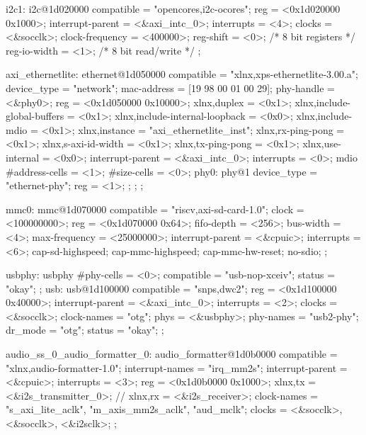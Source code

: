 \begin{CodeBlock}[language=BookDTS]
{{        i2c1: i2c@1d020000 {
            compatible = "opencores,i2c-ocores";
            reg = <0x1d020000 0x1000>;
            interrupt-parent = <&axi_intc_0>;
            interrupts = <4>;
            clocks = <&socclk>;
            clock-frequency = <400000>;
            reg-shift = <0>;    /* 8 bit registers */
            reg-io-width = <1>; /* 8 bit read/write */
        };

        axi_ethernetlite: ethernet@1d050000 {
            compatible = "xlnx,xps-ethernetlite-3.00.a";
            device_type = "network";
            mac-address = [19 98 00 01 00 29];
            phy-handle = <&phy0>;
            reg = <0x1d050000 0x10000>;
            xlnx,duplex = <0x1>;
            xlnx,include-global-buffers = <0x1>;
            xlnx,include-internal-loopback = <0x0>;
            xlnx,include-mdio = <0x1>;
            xlnx,instance = "axi_ethernetlite_inst";
            xlnx,rx-ping-pong = <0x1>;
            xlnx,s-axi-id-width = <0x1>;
            xlnx,tx-ping-pong = <0x1>;
            xlnx,use-internal = <0x0>;
            interrupt-parent = <&axi_intc_0>;
            interrupts = <0>;
            mdio {
                #address-cells = <1>;
                #size-cells = <0>;
                phy0: phy@1 {
                    device_type = "ethernet-phy";
                    reg = <1>;
                } ;
            } ;
        } ;

        mmc0: mmc@1d070000 {
            compatible = "riscv,axi-sd-card-1.0";
            clock = <100000000>;
            reg = <0x1d070000 0x64>;
            fifo-depth = <256>;
            bus-width = <4>;
            max-frequency = <25000000>;
            interrupt-parent = <&cpuic>;
            interrupts = <6>;
            cap-sd-highspeed;
            cap-mmc-highspeed;
            cap-mmc-hw-reset;
            no-sdio;
        };

        usbphy: usbphy {
            #phy-cells = <0>;
            compatible = "usb-nop-xceiv";
            status = "okay";
        };
        usb: usb@1d100000 {
            compatible = "snps,dwc2";
            reg = <0x1d100000 0x40000>;
            interrupt-parent = <&axi_intc_0>;
            interrupts = <2>;
            clocks = <&socclk>;
            clock-names = "otg";
            phys = <&usbphy>;
            phy-names = "usb2-phy";
            dr_mode = "otg";
            status = "okay";
        };

        audio_ss_0_audio_formatter_0: audio_formatter@1d0b0000 {
            compatible = "xlnx,audio-formatter-1.0";
            interrupt-names = "irq_mm2s";
            interrupt-parent = <&cpuic>;
            interrupts = <3>;
            reg = <0x1d0b0000 0x1000>;
            xlnx,tx = <&i2s_transmitter_0>;
            // xlnx,rx = <&i2s_receiver>;
            clock-names = "s_axi_lite_aclk", "m_axis_mm2s_aclk", "aud_mclk";
            clocks = <&socclk>, <&socclk>, <&i2sclk>;
        };

}}
\end{CodeBlock}
